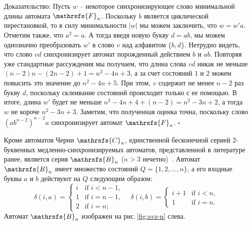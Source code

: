 \documentclass[11pt]{article}
\newenvironment{proof}{Доказательство:}{$\square$}
\begin{document}
\begin{proof}
Пусть $w$ -- некоторое синхронизирующее слово минимальной длины автомата $\mathrsfs{F}_n$.
Поскольку $b$ является циклической перестановкой, то в силу минимальности $|w|$ мы можем заключить, что
$w = w'a$. Отметим также, что $a^2 = a$. А тогда введя новую букву $d = ab$,
мы можем однозначно преобразовать $w'$ в слово $v$ над алфавитом $\{b,d\}$.
Нетрудно видеть, что слово $vd$ синхронизирует автомат порожденный действием $b$ и $ab$.
Повторяя уже стандартные рассуждения мы получаем, что длина слова $vd$ никак не меньше $(n - 2)n - (2n - 2) + 1 = n^2 - 4n + 3$,
а за счет состояний $1$ и $2$ можем повысить это значение до $n^2 - 4n + 5$. При этом, $v$ содержит не менее $n - 2$ раз букву $d$,
поскольку склеивание состояний происходит только с ее помощью. В итоге, длина $w'$ будет не меньше $n^2 - 4n + 4 + (n - 2) = n^2 - 3n + 2$,
а тогда $w$ не короче $n^2 - 3n + 3$. Заметим, что полученная оценка точна, поскольку слово $(ab^{n - 2})^{n - 2}a$ 
синхронизирует автомат $\mathrsfs{F}_n$.
\end{proof}


Кроме автоматов Черни $\mathrsfs{C}_n$, единственной бесконечной серией
2-буквенных медленно-синхронизируемых автоматов, 
представленной в литературе ранее, является серия $\mathrsfs{B}_n$ ($n>3$
нечетно)~\cite{AVZ}. Автомат $\mathrsfs{B}_n$ имеет множество состояний 
$Q=\{1,2,\dots,n\}$, а его входные буквы $a$ и $b$ действуют на $Q$ следующим
образом:
$$\delta(i,a)=\begin{cases}
i &\text{if } i<n-1,\\
1 &\text{if } i=n-1,\\
2 &\text{if } i=n;
\end{cases}\quad
\delta(i,b)=\begin{cases}
i+1 &\text{if } i<n,\\
1 &\text{if } i=n.
\end{cases}$$
Автомат $\mathrsfs{B}_n$ изображен на рис.\,\ref{fig:avz-n} слева.
\end{document}
